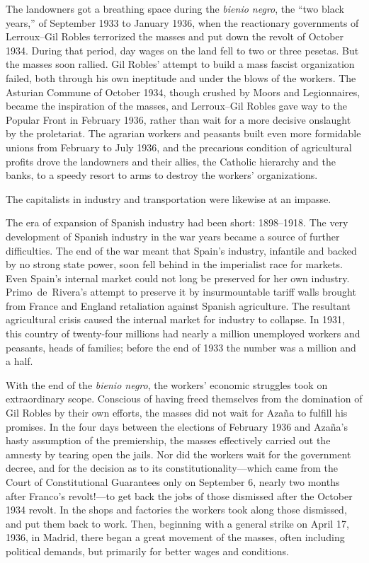 The landowners got a breathing space during the \emph{bienio negro}{\indexbienionegro}, the ``two black years,'' of September 1933 to January 1936, when the reactionary governments of Lerroux--Gil Robles{\indexALerroux\indexGRobles} terrorized the masses and put down the revolt of October 1934. During that period, day wages on the land fell to two or three pesetas. But the masses soon rallied. Gil Robles’ attempt to build a mass fascist organization failed, both through his own ineptitude and under the blows of the workers. The Asturian Commune of October 1934, though crushed by Moors and Legionnaires, became the inspiration of the masses, and Lerroux--Gil Robles gave way to the Popular Front in February 1936, rather than wait for a more decisive onslaught by the proletariat. The agrarian workers and peasants built even more formidable unions from February to July 1936, and the precarious condition of agricultural profits drove the landowners and their allies, the Catholic hierarchy and the banks, to a speedy resort to arms to destroy the workers’ organizations.

The capitalists in industry and transportation were likewise at an impasse.

The era of expansion of Spanish industry had been short: 1898--1918. The very development of Spanish industry in the war years became a source of further difficulties. The end of the war meant that Spain’s industry, infantile and backed by no strong state power, soon fell behind in the imperialist race for markets. Even Spain’s internal market could not long be preserved for her own industry. Primo~de~Rivera’s attempt to preserve it by insurmountable tariff walls brought from France and England retaliation against Spanish agriculture. The resultant agricultural crisis caused the internal market for industry to collapse. In 1931, this country of twenty-four millions had nearly a million unemployed workers and peasants, heads of families; before the end of 1933 the number was a million and a half.

With the end of the \emph{bienio negro}, the workers’ economic struggles took on extraordinary scope. Conscious of having freed themselves from the domination of Gil Robles by their own efforts, the masses did not wait for Azaña to fulfill his promises. In the four days between the elections of February 1936 and Azaña’s hasty assumption of the premiership, the masses effectively carried out the amnesty by tearing open the jails. Nor did the workers wait for the government decree, and for the decision as to its constitutionality---which came from the Court of Constitutional Guarantees only on September 6, nearly two months after Franco’s revolt!---to get back the jobs of those dismissed after the October 1934 revolt. In the shops and factories the workers took along those dismissed, and put them back to work. Then, beginning with a general strike on April 17, 1936, in Madrid, there began a great movement of the masses, often including political demands, but primarily for better wages and conditions.

